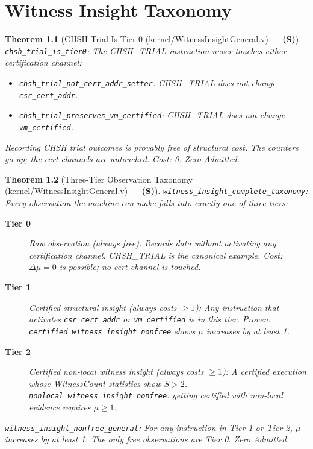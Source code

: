 \documentclass[11pt, a4paper]{report}
\theoremstyle{definition}
\theoremstyle{plain}
\newtheorem{theorem}{Theorem}[chapter]
\begin{document}
\chapter{Witness Insight Taxonomy}

\begin{theorem}[CHSH Trial Is Tier 0 {\normalfont (kernel/WitnessInsightGeneral.v)} --- \textbf{(S)}]
\texttt{chsh\_trial\_is\_tier0}: The CHSH\_TRIAL instruction never touches either certification channel:
\begin{itemize}
    \item \texttt{chsh\_trial\_not\_cert\_addr\_setter}: CHSH\_TRIAL does not change \texttt{csr\_cert\_addr}.
    \item \texttt{chsh\_trial\_preserves\_vm\_certified}: CHSH\_TRIAL does not change \texttt{vm\_certified}.
\end{itemize}
Recording CHSH trial outcomes is provably free of structural cost. The counters go up; the cert channels are untouched. Cost: 0. Zero Admitted.
\end{theorem}

\begin{theorem}[Three-Tier Observation Taxonomy {\normalfont (kernel/WitnessInsightGeneral.v)} --- \textbf{(S)}]
\label{thm:taxonomy}
\texttt{witness\_insight\_complete\_taxonomy}: Every observation the machine can make falls into exactly one of three tiers:

\begin{description}
    \item[\textbf{Tier 0}] Raw observation (always free): Records data without activating any certification channel. CHSH\_TRIAL is the canonical example. Cost: $\Delta\mu = 0$ is possible; no cert channel is touched.
    \item[\textbf{Tier 1}] Certified structural insight (always costs $\ge 1$): Any instruction that activates \texttt{csr\_cert\_addr} or \texttt{vm\_certified} is in this tier. Proven: \texttt{certified\_witness\_insight\_nonfree} shows $\mu$ increases by at least 1.
    \item[\textbf{Tier 2}] Certified non-local witness insight (always costs $\ge 1$): A certified execution whose WitnessCount statistics show $S > 2$. \texttt{nonlocal\_witness\_insight\_nonfree}: getting certified with non-local evidence requires $\mu \ge 1$.
\end{description}

\texttt{witness\_insight\_nonfree\_general}: For any instruction in Tier 1 or Tier 2, $\mu$ increases by at least 1. The only free observations are Tier 0. Zero Admitted.
\end{theorem}
\end{document}
